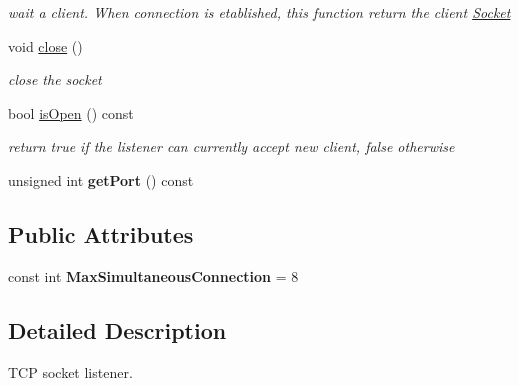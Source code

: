 \begin{DoxyCompactItemize}
\begin{DoxyCompactList}\small\item\em wait a client. When connection is etablished, this function return the client \hyperlink{classFTP_1_1TCP_1_1Socket}{Socket} \end{DoxyCompactList}\item 
\hypertarget{classFTP_1_1TCP_1_1Listener_aeeaa42d5d438dbd156500dffde6caaa2}{}void \hyperlink{classFTP_1_1TCP_1_1Listener_aeeaa42d5d438dbd156500dffde6caaa2}{close} ()\label{classFTP_1_1TCP_1_1Listener_aeeaa42d5d438dbd156500dffde6caaa2}

\begin{DoxyCompactList}\small\item\em close the socket \end{DoxyCompactList}\item 
\hypertarget{classFTP_1_1TCP_1_1Listener_afa96842f3eda508d047553ba09f7be87}{}bool \hyperlink{classFTP_1_1TCP_1_1Listener_afa96842f3eda508d047553ba09f7be87}{is\+Open} () const \label{classFTP_1_1TCP_1_1Listener_afa96842f3eda508d047553ba09f7be87}

\begin{DoxyCompactList}\small\item\em return true if the listener can currently accept new client, false otherwise \end{DoxyCompactList}\item 
\hypertarget{classFTP_1_1TCP_1_1Listener_a068338ce03ae095bfe6f1f6261035886}{}unsigned int {\bfseries get\+Port} () const \label{classFTP_1_1TCP_1_1Listener_a068338ce03ae095bfe6f1f6261035886}

\end{DoxyCompactItemize}
\subsection*{Public Attributes}
\begin{DoxyCompactItemize}
\item 
\hypertarget{classFTP_1_1TCP_1_1Listener_a8989ba42888d474698f599cbec3134df}{}const int {\bfseries Max\+Simultaneous\+Connection} = 8\label{classFTP_1_1TCP_1_1Listener_a8989ba42888d474698f599cbec3134df}

\end{DoxyCompactItemize}


\subsection{Detailed Description}
T\+C\+P socket listener. 

